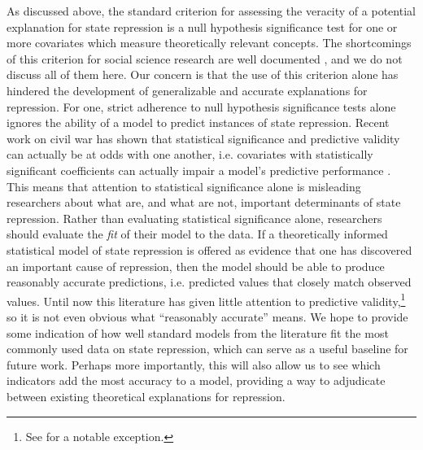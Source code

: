 \documentclass[12pt]{article}
\begin{document}
As discussed above, the standard criterion for assessing the veracity of a potential explanation for state repression is a null hypothesis significance test for one or more covariates which measure theoretically relevant concepts. The shortcomings of this criterion for social science research are well documented \citep[See, e.g.][]{Gill1999}, and we do not discuss all of them here. Our concern is that the use of this criterion alone has hindered the development of generalizable and accurate explanations for repression. For one, strict adherence to null hypothesis significance tests alone ignores the ability of a model to predict instances of state repression. Recent work on civil war has shown that statistical significance and predictive validity can actually be at odds with one another, i.e. covariates with statistically significant coefficients can actually impair a model's predictive performance \citep{Wardetal2010}. This means that attention to statistical significance alone is misleading researchers about what are, and what are not, important determinants of state repression. Rather than evaluating statistical significance alone, researchers should evaluate the {\em fit} of their model to the data. If a theoretically informed statistical model of state repression is offered as evidence that one has discovered an important cause of repression, then the model should be able to produce reasonably accurate predictions, i.e. predicted values that closely match observed values. Until now this literature has given little attention to predictive validity,\footnote{See \citet{PoeRostCarey2006} for a notable exception.} so it is not even obvious what ``reasonably accurate'' means. We hope to provide some indication of how well standard models from the literature fit the most commonly used data on state repression, which can serve as a useful baseline for future work. Perhaps more importantly, this will also allow us to see which indicators add the most accuracy to a model, providing a way to adjudicate between existing theoretical explanations for repression.
\end{document}
